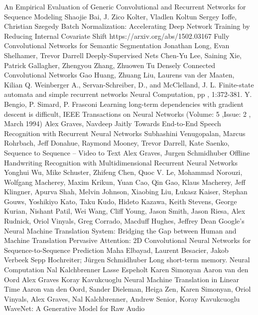 \documentclass[a4paper,11pt,twoside]{report}
\theoremstyle{definition}
\begin{document}
\begin{thebibliography}{20}
 An Empirical Evaluation of Generic Convolutional and Recurrent Networks for Sequence Modeling Shaojie Bai, J. Zico Kolter, Vladlen Koltun
Sergey Ioffe, Christian Szegedy Batch Normalization: Accelerating Deep Network Training by Reducing Internal Covariate Shift https://arxiv.org/abs/1502.03167
Fully Convolutional Networks for Semantic Segmentation Jonathan Long, Evan Shelhamer, Trevor Darrell
Deeply-Supervised Nets Chen-Yu Lee, Saining Xie, Patrick Gallagher, Zhengyou Zhang, Zhuowen Tu
Densely Connected Convolutional Networks Gao Huang, Zhuang Liu, Laurens van der Maaten, Kilian Q. Weinberger
 A., Servan-Schreiber, D., and McClelland, J. L. Finite-state automata and simple recurrent networks Neural Computation, pp , 1:372-381.
 Y. Bengio, P. Simard, P. Frasconi Learning long-term dependencies with gradient descent is difficult, IEEE Transactions on Neural Networks (Volume: 5 ,Issue: 2 , March 1994)
 Alex Graves, Navdeep Jaitly Towards End-to-End Speech Recognition with Recurrent Neural Networks
 Subhashini Venugopalan, Marcus Rohrbach, Jeff Donahue, Raymond Mooney, Trevor Darrell, Kate Saenko,  Sequence to Sequence -- Video to Text
 Alex Graves, Jurgen Schmidhuber Offline Handwriting Recognition with Multidimensional Recurrent Neural Networks
 Yonghui Wu, Mike Schuster, Zhifeng Chen, Quoc V. Le, Mohammad Norouzi, Wolfgang Macherey, Maxim Krikun, Yuan Cao, Qin Gao, Klaus Macherey, Jeff Klingner, Apurva Shah, Melvin Johnson, Xiaobing Liu, Łukasz Kaiser, Stephan Gouws, Yoshikiyo Kato, Taku Kudo, Hideto Kazawa, Keith Stevens, George Kurian, Nishant Patil, Wei Wang, Cliff Young, Jason Smith, Jason Riesa, Alex Rudnick, Oriol Vinyals, Greg Corrado, Macduff Hughes, Jeffrey Dean Google's Neural Machine Translation System: Bridging the Gap between Human and Machine Translation
Pervasive Attention: 2D Convolutional Neural Networks for Sequence-to-Sequence Prediction Maha Elbayad, Laurent Besacier, Jakob Verbeek
 Sepp Hochreiter; Jürgen Schmidhuber Long short-term memory. Neural Computation
 Nal Kalchbrenner  Lasse Espeholt  Karen Simonyan  Aaron van den Oord  Alex Graves  Koray Kavukcuoglu Neural Machine Translation in Linear Time
Aaron van den Oord, Sander Dieleman, Heiga Zen, Karen Simonyan, Oriol Vinyals, Alex Graves, Nal Kalchbrenner, Andrew Senior, Koray Kavukcuoglu WaveNet: A Generative Model for Raw Audio

\end{thebibliography}
\end{document}
